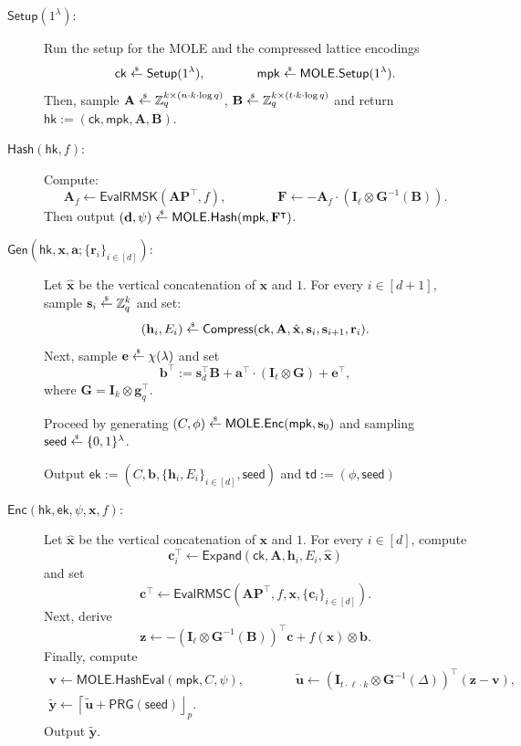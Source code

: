\documentclass{article}
\newcommand{\ek}{\mathsf{ek}}
\newcommand{\td}{\mathsf{td}}
\newcommand{\MOLE}{\mathsf{MOLE}}
\newcommand{\getsr}{\overset{\raisebox{-1pt}{$\scriptscriptstyle \$$}}{\gets}}
\newcommand{\sample}{\getsr}
\newcommand{\Z}{\mathbb{Z}}
\renewcommand{\sec}{\ensuremath{\lambda}}
\newcommand{\secpar}{\sec}
\newcommand{\Compress}{\mathsf{Compress}}
\newcommand{\ck}{\mathsf{ck}}
\newcommand{\algofont}[1]{\ensuremath{\mathsf{#1}}}
\newcommand{\Enc}{{\algofont{Enc}}}
\newcommand{\Setup}{{\algofont{Setup}}}
\newcommand{\Gen}{{\algofont{Gen}}}
\newcommand{\Eval}{\algofont{Eval}\xspace}
\newcommand{\Hash}{{\algofont{Hash}}}
\newcommand{\Expand}{\algofont{Expand}}
\newcommand{\id}{\ensuremath{\mathbf{I}}}
\newcommand{\mpk}{\mathsf{mpk}}
\newcommand{\hk}{\ensuremath{\mathsf{hk}}}
\newcommand\bbbone{1}
\newenvironment{protocol}[1][]
{\begin{algorithm}\caption{#1}}
  {\end{algorithm}}
\begin{document}
\begin{protocol}[Input-Succinct Reverse TDH for RMS]\label{prot:R1LFE}
\setlength{\abovedisplayskip}{6pt}\setlength{\belowdisplayskip}{6pt}
\setlength{\belowdisplayshortskip}{6pt}

\begin{description}
\item[$\Setup(1^\secpar)$:] Run the setup for the MOLE and the compressed lattice encodings
\[\ck\sample\Setup(\bbbone^\sec),\qquad \qquad \mpk\sample\MOLE.\Setup(\bbbone^\sec).\]
Then, sample $\mathbf{A}\sample\Z_q^{k\times (n\cdot k\cdot \log q)}$, $\mathbf{B}\sample\Z_q^{k\times (t\cdot k\cdot \log q)}$ and return $\hk:=(\ck, \mpk, \mathbf{A}, \mathbf{B})$.


\item[$\Hash(\hk, f)$:] Compute:
\[ \mathbf{A}_f\gets \Eval\mathsf{RMSK}(\mathbf{A}\mathbf{P}^\intercal, f), \qquad \qquad \mathbf{F}\gets -\mathbf{A}_f\cdot (\id_\ell \otimes \mathbf{G}^{-1}(\mathbf{B})).\]
Then output $(\mathbf{d}, \psi)\sample\MOLE.\Hash(\mpk,\mathbf{F}^\intercal)$.



\item[$\Gen\left(\hk, \mathbf{x}, \mathbf{a}; \{\mathbf{r}_i\}_{i\in[d]}\right)$:] Let $\hat{\mathbf{x}}$ be the vertical concatenation of $\mathbf{x}$ and $1$.
For every $i\in[d+1]$, sample $\mathbf{s}_i\sample\Z_q^k$ and set:
\[(\mathbf{h}_i, E_{i})\sample\Compress(\ck, \mathbf{A}, \hat{\mathbf{x}}, \mathbf{s}_i, \mathbf{s}_{i+1}, \mathbf{r}_i).\]
Next, sample $\mathbf{e}\sample\chi(\sec)$ and set
\[
\mathbf{b}^\intercal:= \mathbf{s}_d^\intercal \mathbf{B}+\mathbf{a}^\intercal\cdot (\id_t\otimes \mathbf{G}) +\mathbf{e}^\intercal,
\]
where $\mathbf{G}=\id_k\otimes \mathbf{g}_q^\intercal$.

Proceed by generating $(C, \phi)\sample\MOLE.\Enc(\mpk, \mathbf{s}_0)$ and sampling $\mathsf{seed}\sample\{0, 1\}^\sec$.

 Output $\ek:=(C, \mathbf{b}, \{\mathbf{h}_i, E_i\}_{i\in[d]}, \mathsf{seed})$ and $\td:=(\phi, \mathsf{seed})$


\item[$\Enc(\hk, \ek, \psi, \mathbf{x}, f)$:] Let $\hat{\mathbf{x}}$ be the vertical concatenation of $\mathbf{x}$ and $1$. For every $i\in[d]$, compute
\[
\mathbf{c}_i^\intercal\gets \Expand(\ck, \mathbf{A}, \mathbf{h}_i, E_i, \hat{\mathbf{x}})
\]
and set
\[
\mathbf{c}^\intercal\gets \Eval\mathsf{RMSC}(\mathbf{A}\mathbf{P}^\intercal, f, \mathbf{x}, \{\mathbf{c}_i\}_{i\in[d]}).
\]
Next, derive
\[
\mathbf{z}\gets -(\id_\ell\otimes \mathbf{G}^{-1}(\mathbf{B}))^\intercal \mathbf{c}
+f(\mathbf{x})\otimes \mathbf{b}.
\]
Finally, compute
\begin{gather*}
\mathbf{v}\gets \MOLE.\Hash\Eval(\mpk, C, \psi), \qquad\qquad
\tilde{\mathbf{u}}\gets (\id_{t\cdot \ell\cdot k}\otimes \mathbf{G}^{-1}(\Delta))^\intercal (\mathbf{z}-\mathbf{v}),\\
\tilde{\mathbf{y}}\gets \left\lceil \tilde{\mathbf{u}}+\mathsf{PRG}(\mathsf{seed})\right\rfloor_p.
\end{gather*}
 Output $\tilde{\mathbf{y}}$. 


\end{description}
\end{protocol}
\end{document}
